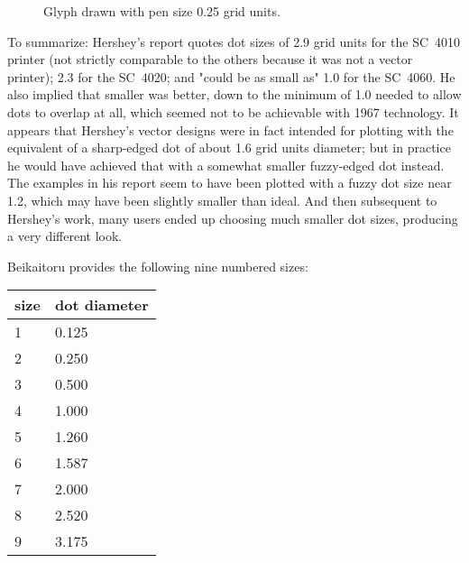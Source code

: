 \documentclass{article}
\newcommand{\SegRad}{0.79}
\newcommand{\FatSegment}[2]{%
($(#1)!\SegRad cm!90:(#2)$) %
  ..controls ($(#1)!1.12*\SegRad cm!120:(#2)$) %
         and ($(#1)!1.12*\SegRad cm!150:(#2)$).. %
($(#1)!-\SegRad cm!0:(#2)$) %
  ..controls ($(#1)!1.12*\SegRad cm!-150:(#2)$) %
         and ($(#1)!1.12*\SegRad cm!-120:(#2)$).. %
($(#1)!\SegRad cm!-90:(#2)$) -- %
($(#2)!\SegRad cm!90:(#1)$) %
  ..controls ($(#2)!1.12*\SegRad cm!120:(#1)$) %
         and ($(#2)!1.12*\SegRad cm!150:(#1)$).. %
($(#2)!-\SegRad cm!0:(#1)$) %
  ..controls ($(#2)!1.12*\SegRad cm!-150:(#1)$) %
         and ($(#2)!1.12*\SegRad cm!-120:(#1)$).. %
($(#2)!\SegRad cm!-90:(#1)$) -- %
cycle %
}
\begin{document}
\begin{figure}
  \centering\renewcommand{\SegRad}{0.125}
  \caption{Glyph drawn with pen size 0.25 grid units.}
  \label{fig:capa-vthin}
\end{figure}

To summarize:  Hershey's report quotes dot sizes of 2.9 grid units for the
SC~4010 printer (not strictly comparable to the others because it was not a
vector printer); 2.3 for the SC~4020; and "could be as small as" 1.0 for the
SC~4060.  He also implied that smaller was better, down to the minimum of
1.0 needed to allow dots to overlap at all, which seemed not to be
achievable with 1967 technology.  It appears that Hershey's vector designs
were in fact intended for plotting with the equivalent of a sharp-edged dot
of about 1.6 grid units diameter; but in practice he would have achieved
that with a somewhat smaller fuzzy-edged dot instead.  The examples in his
report seem to have been plotted with a fuzzy dot size near 1.2, which may
have been slightly smaller than ideal.  And then subsequent to Hershey's
work, many users ended up choosing much smaller dot sizes, producing a very
different look.

Beikaitoru provides the following nine numbered sizes:

\begin{tabular}{ll}
  size & dot diameter \\ \hline
  1 & 0.125 \\
  2 & 0.250 \\
  3 & 0.500 \\
  4 & 1.000 \\
  5 & 1.260 \\
  6 & 1.587 \\
  7 & 2.000 \\
  8 & 2.520 \\
  9 & 3.175
\end{tabular}
\end{document}
